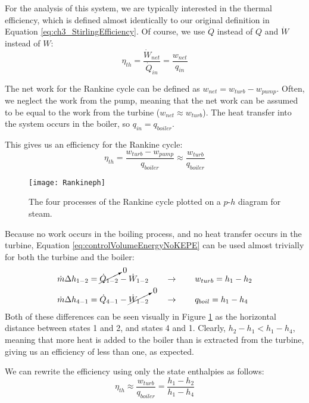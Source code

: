 For the analysis of this system, we are typically interested in the thermal efficiency, which is defined almost identically to our original definition in Equation \ref{eq:ch3_StirlingEfficiency}.  Of course, we use $\dot{Q}$ instead of $Q$ and $\dot{W}$ instead of $W$:
\begin{equation*} 
  \eta_{th} = \frac{\dot{W}_{net}}{\dot{Q}_{in}} = \frac{w_{net}}{q_{in}}
\end{equation*}

The net work for the Rankine cycle can be defined as $w_{net} = w_{turb}-w_{pump}$.  Often, we neglect the work from the pump, meaning that the net work can be assumed to be equal to the work from the turbine ($w_{net}\approx w_{turb}$).  The heat transfer into the system occurs in the boiler, so $q_{in} = q_{boiler}$.

This gives us an efficiency for the Rankine cycle:
\begin{equation} \label{eq:ch4_RankineEfficiency}
  \eta_{th} = \frac{w_{turb} - w_{pump}}{q_{boiler}} \approx \frac{w_{turb}}{q_{boiler}}
\end{equation}

\begin{figure}[H]
\centering
\texttt{[image: Rankineph]}
\caption{The four processes of the Rankine cycle plotted on a $p$-$h$ diagram for steam.}
\label{fig:ch4_rankineph}
\end{figure}

Because no work occurs in the boiling process, and no heat transfer occurs in the turbine, Equation \ref{eq:controlVolumeEnergyNoKEPE} can be used almost trivially for both the turbine and the boiler:
\begin{align*}
  \dot{m} \Delta h_{1-2} &= \cancelto{0}{\dot{Q}_{1-2}} - \dot{W}_{1-2}  \quad\quad\rightarrow\quad\quad w_{turb} = h_1 - h_2 \\
  \dot{m} \Delta h_{4-1} &= \dot{Q}_{4-1} - \cancelto{0}{\dot{W}_{1-2}}  \quad\quad\rightarrow\quad\quad q_{boil} = h_1 - h_4
\end{align*}
Both of these differences can be seen visually in Figure \ref{fig:ch4_rankineph} as the horizontal distance between states 1 and 2, and states 4 and 1.  Clearly, $h_2 - h_1 < h_1 - h_4$, meaning that more heat is added to the boiler than is extracted from the turbine, giving us an efficiency of less than one, as expected.

We can rewrite the efficiency using only the state enthalpies as follows:
\begin{equation} \label{eq:ch4_RankineEfficiencySimplified}
  \eta_{th} \approx \frac{w_{turb}}{q_{boiler}} = \frac{h_1-h_2}{h_1 - h_4}
\end{equation}


